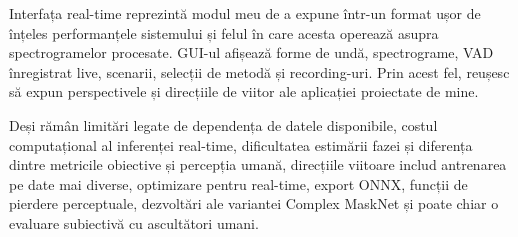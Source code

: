 \documentclass[12pt,a4paper]{report}
\begin{document}
Interfața real-time reprezintă modul meu de a expune într-un format 
ușor de înțeles performanțele sistemului și felul în care acesta 
operează asupra spectrogramelor procesate. GUI-ul afișează forme de 
undă, spectrograme, VAD înregistrat live, scenarii, selecții de 
metodă și recording-uri. Prin acest fel, reușesc să expun perspectivele 
și direcțiile de viitor ale aplicației proiectate de mine.

Deși rămân limitări legate de dependența de datele disponibile, 
costul computațional al inferenței real-time, dificultatea estimării 
fazei și diferența dintre metricile obiective și percepția umană, 
direcțiile viitoare includ antrenarea pe date mai diverse, optimizare 
pentru real-time, export ONNX, funcții de pierdere perceptuale, 
dezvoltări ale variantei Complex MaskNet și poate chiar o evaluare 
subiectivă cu ascultători umani.
\end{document}

